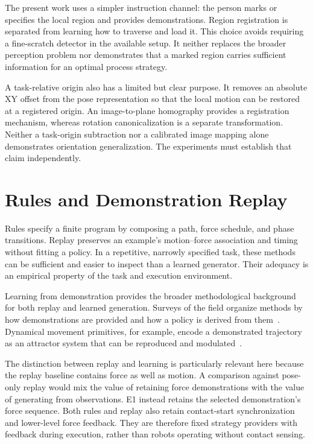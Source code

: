 The present work uses a simpler instruction channel: the person marks or specifies the local region and provides demonstrations. Region registration is separated from learning how to traverse and load it. This choice avoids requiring a fine-scratch detector in the available setup. It neither replaces the broader perception problem nor demonstrates that a marked region carries sufficient information for an optimal process strategy.

A task-relative origin also has a limited but clear purpose. It removes an absolute XY offset from the pose representation so that the local motion can be restored at a registered origin. An image-to-plane homography provides a registration mechanism, whereas rotation canonicalization is a separate transformation. Neither a task-origin subtraction nor a calibrated image mapping alone demonstrates orientation generalization. The experiments must establish that claim independently.

\section{Rules and Demonstration Replay}
Rules specify a finite program by composing a path, force schedule, and phase transitions. Replay preserves an example's motion--force association and timing without fitting a policy. In a repetitive, narrowly specified task, these methods can be sufficient and easier to inspect than a learned generator. Their adequacy is an empirical property of the task and execution environment.

Learning from demonstration provides the broader methodological background for both replay and learned generation. Surveys of the field organize methods by how demonstrations are provided and how a policy is derived from them~\cite{argall2009survey,ravichandar2020recent}. Dynamical movement primitives, for example, encode a demonstrated trajectory as an attractor system that can be reproduced and modulated~\cite{ijspeert2013dmp}.

The distinction between replay and learning is particularly relevant here because the replay baseline contains force as well as motion. A comparison against pose-only replay would mix the value of retaining force demonstrations with the value of generating from observations. E1 instead retains the selected demonstration's force sequence. Both rules and replay also retain contact-start synchronization and lower-level force feedback. They are therefore fixed strategy providers with feedback during execution, rather than robots operating without contact sensing.

